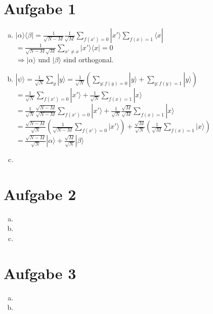 \documentclass[a4paper]{scrartcl}
\begin{document}
\section*{Aufgabe 1}
\begin{enumerate}[a)]
\item $ |\alpha \rangle \langle \beta | = \frac{1}{\sqrt{N-M}} \frac{1}{\sqrt{M}} \sum_{f(x')=0} |x'\rangle \sum_{f(x)=1} \langle x |$\\
$=\frac{1}{\sqrt{N-M} \sqrt{M}} \sum_{x'\neq x} |x'\rangle \langle x | = 0$\\
$\Rightarrow |\alpha \rangle$ und $| \beta \rangle$ sind orthogonal.

\item $ | \psi \rangle = \frac{1}{\sqrt{N}} \sum_y |y\rangle = \frac{1}{\sqrt{N}} (\sum_{y: f(y) = 0} |y\rangle + \sum_{y: f(y) = 1} |y\rangle)$\\
$= \frac{1}{\sqrt{N}} \sum_{f(x') = 0} |x'\rangle + \frac{1}{\sqrt{N}} \sum_{f(x) = 1} |x\rangle$\\
$= \frac{1}{\sqrt{N}} \frac{\sqrt{N-M}}{\sqrt{N-M}} \sum_{f(x') = 0} |x'\rangle + \frac{1}{\sqrt{N}} \frac{\sqrt{M}}{\sqrt{M}} \sum_{f(x) = 1} |x\rangle$\\
$= \frac{\sqrt{N-M}}{\sqrt{N}} (\frac{1}{\sqrt{N-M}} \sum_{f(x') = 0} |x'\rangle) + \frac{\sqrt{M}}{\sqrt{N}} (\frac{1}{\sqrt{M}} \sum_{f(x) = 1} |x\rangle)$\\
$= \frac{\sqrt{N-M}}{\sqrt{N}} |\alpha \rangle + \frac{\sqrt{M}}{\sqrt{N}} |\beta \rangle$\\


\item

\end{enumerate}


\newpage
\section*{Aufgabe 2}
\begin{enumerate}[a)]
\item
\item
\item

\end{enumerate}

\newpage
\section*{Aufgabe 3}
\begin{enumerate}[a)]
\item
\item

\end{enumerate}
\end{document}
